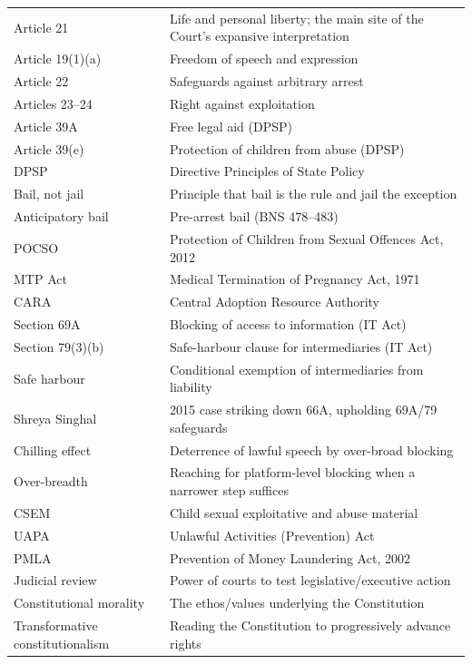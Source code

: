 \begin{tabularx}{\textwidth}{YY}
\toprule
{} &  \\
\midrule
Article 21 & Life and personal liberty; the main site of the Court's expansive
interpretation \\
Article 19(1)(a) & Freedom of speech and expression \\
Article 22 & Safeguards against arbitrary arrest \\
Articles 23--24 & Right against exploitation \\
Article 39A & Free legal aid (DPSP) \\
Article 39(e) & Protection of children from abuse (DPSP) \\
DPSP & Directive Principles of State Policy \\
Bail, not jail & Principle that bail is the rule and jail the exception \\
Anticipatory bail & Pre-arrest bail (BNS 478--483) \\
POCSO & Protection of Children from Sexual Offences Act, 2012 \\
MTP Act & Medical Termination of Pregnancy Act, 1971 \\
CARA & Central Adoption Resource Authority \\
Section 69A & Blocking of access to information (IT Act) \\
Section 79(3)(b) & Safe-harbour clause for intermediaries (IT Act) \\
Safe harbour & Conditional exemption of intermediaries from liability \\
Shreya Singhal & 2015 case striking down 66A, upholding 69A/79 safeguards \\
Chilling effect & Deterrence of lawful speech by over-broad blocking \\
Over-breadth & Reaching for platform-level blocking when a narrower step suffices \\
CSEM & Child sexual exploitative and abuse material \\
UAPA & Unlawful Activities (Prevention) Act \\
PMLA & Prevention of Money Laundering Act, 2002 \\
Judicial review & Power of courts to test legislative/executive action \\
Constitutional morality & The ethos/values underlying the Constitution \\
Transformative constitutionalism & Reading the Constitution to progressively advance rights \\
\bottomrule
\end{tabularx}
